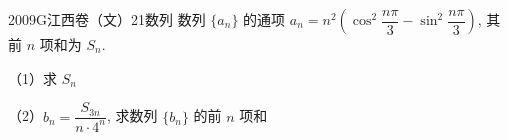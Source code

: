 
\begin{problem}{2009}{G}{江西卷（文）}{21}{数列}
数列 $\{a_n\}$ 的通项 $a_n=n^2\left(\cos^2\dfrac{n\pi}{3}-\sin^2\dfrac{n\pi}{3}\right)$, 其前 $n$ 项和为 $S_n$.

（1）求 $S_n$

（2）$b_n = \dfrac{S_{3n}}{n \cdot 4^n}$, 求数列 $\{b_n\}$ 的前 $n$ 项和
\end{problem}